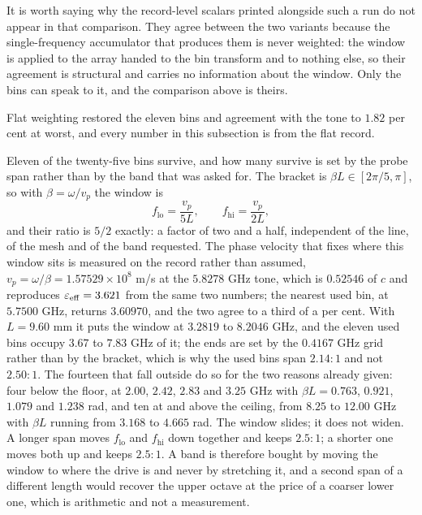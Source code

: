 It is worth saying why the record-level scalars printed alongside such a run do not appear in that comparison. They
agree between the two variants because the single-frequency accumulator that produces them is never weighted: the
window is applied to the array handed to the bin transform and to nothing else, so their agreement is structural
and carries no information about the window. Only the bins can speak to it, and the comparison above is theirs.

Flat weighting restored the eleven bins and
agreement with the tone to $1.82$ per cent at worst, and every number in this subsection is from the flat record.

Eleven of the twenty-five bins survive, and how many survive is set by the probe span rather than by the band that
was asked for. The bracket is $\beta L \in [2\pi/5, \pi]$, so with $\beta = \omega/v_p$ the window is
\begin{equation}
  f_{\mathrm{lo}} = \frac{v_p}{5L}, \qquad f_{\mathrm{hi}} = \frac{v_p}{2L},
\end{equation}
and their ratio is $5/2$ exactly: a factor of two and a half, independent of the line, of the mesh and of the band
requested. The phase velocity that fixes where this window sits is measured on the record rather than assumed,
$v_p = \omega/\beta = 1.57529\times10^{8}$ m/s at the $5.8278$ GHz tone, which is $0.52546$ of $c$ and reproduces
$\varepsilon_{\mathrm{eff}} = 3.621$ from the same two numbers; the nearest used bin, at $5.7500$ GHz, returns $3.60970$,
and the two agree to a third of a per cent. With $L = 9.60$ mm it puts the window at $3.2819$ to $8.2046$ GHz,
and the eleven used bins occupy $3.67$ to $7.83$ GHz of it; the ends are set by the $0.4167$ GHz grid
rather than by the bracket, which is why the used bins span $2.14:1$ and not $2.50:1$. The fourteen that fall
outside do so for the two reasons already given: four below the floor, at $2.00$, $2.42$, $2.83$ and $3.25$ GHz
with $\beta L = 0.763$, $0.921$, $1.079$ and $1.238$ rad, and ten at and above the ceiling, from $8.25$ to
$12.00$ GHz with $\beta L$ running from $3.168$ to $4.665$ rad. The window slides; it does not widen. A longer span
moves $f_{\mathrm{lo}}$ and $f_{\mathrm{hi}}$ down together and keeps $2.5:1$; a shorter one moves both up and
keeps $2.5:1$. A band is therefore bought by moving the window to where the drive is and never by stretching it,
and a second span of a different length would recover the upper octave at the price of a coarser lower one, which
is arithmetic and not a measurement.

